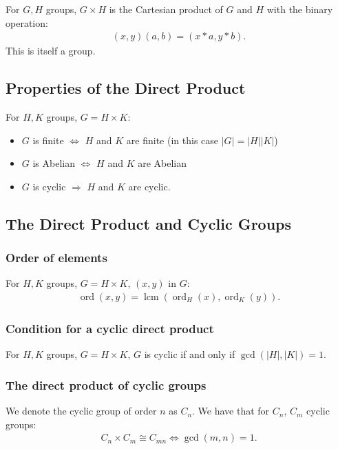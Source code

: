 \documentclass[a4paper, 12pt, twoside]{article}
\DeclareMathOperator{\Ord}{ord}
\DeclareMathOperator{\Gcd}{gcd}
\DeclareMathOperator{\Lcm}{lcm}
\begin{document}
For $G, H$ groups, $G \times H$ is the Cartesian product of $G$ and
$H$ with the binary operation:
\begin{align*}
      (x, y)(a, b) = (x * a, y * b). \tag{$\forall x, a \in G, y, b \in H$}
\end{align*}
This is itself a group.

\subsection{Properties of the Direct Product}

For $H, K$ groups, $G = H \times K$:

\begin{itemize}
      \item $G$ is finite $\Leftrightarrow$ $H$ and $K$ are finite
            (in this case $|G| = |H||K|$)
      \item $G$ is Abelian $\Leftrightarrow$ $H$ and $K$ are Abelian
      \item $G$ is cyclic $\Rightarrow$ $H$ and $K$ are cyclic.
\end{itemize}

\subsection{The Direct Product and Cyclic Groups}

\subsubsection{Order of elements}

For $H, K$ groups, $G = H \times K$, $(x, y)$ in $G$:
\begin{align*}
      \Ord(x, y) = \Lcm(\Ord_H(x), \Ord_K(y)).
\end{align*}

\subsubsection{Condition for a cyclic direct product}

For $H, K$ groups, $G = H \times K$, $G$ is cyclic if and only if
$\Gcd(|H|, |K|) = 1$.

\subsubsection{The direct product of cyclic groups}

We denote the cyclic group of order $n$ as $C_n$. We have that
for $C_n$, $C_m$ cyclic groups:
\begin{align*}
      C_n \times C_m \cong C_{mn} \Leftrightarrow \Gcd(m, n) = 1.
\end{align*}
\end{document}
